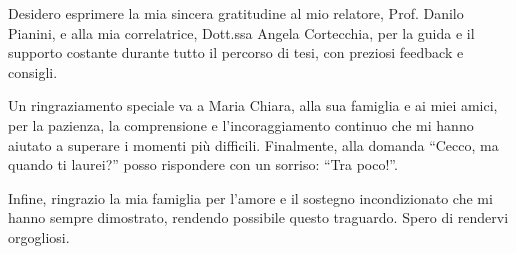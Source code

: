 \documentclass[12pt,a4paper,openright,twoside]{book}
\begin{document}






\backmatter

\listoffigures     %
\lstlistoflistings %





\begin{acknowledgements} %
Desidero esprimere la mia sincera gratitudine al mio relatore, Prof. Danilo Pianini, e alla mia correlatrice, Dott.ssa Angela Cortecchia, per la guida e il supporto costante durante tutto il percorso di tesi, con preziosi feedback e consigli.

Un ringraziamento speciale va a Maria Chiara, alla sua famiglia e ai miei amici, per la pazienza, la comprensione e l’incoraggiamento continuo che mi hanno aiutato a superare i momenti più difficili. Finalmente, alla domanda ``Cecco, ma quando ti laurei?'' posso rispondere con un sorriso: ``Tra poco!''.

Infine, ringrazio la mia famiglia per l’amore e il sostegno incondizionato che mi hanno sempre dimostrato, rendendo possibile questo traguardo. Spero di rendervi orgogliosi.

\end{acknowledgements}
\end{document}
